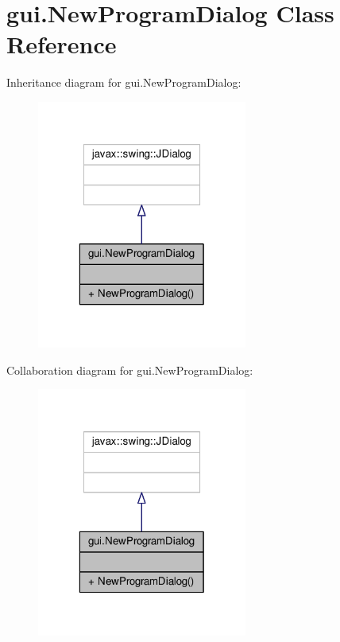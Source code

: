\hypertarget{classgui_1_1NewProgramDialog}{\section{gui.\-New\-Program\-Dialog Class Reference}
\label{classgui_1_1NewProgramDialog}
}


Inheritance diagram for gui.\-New\-Program\-Dialog\-:\nopagebreak
\begin{figure}[H]
\begin{center}
\leavevmode
\includegraphics[width=196pt]{classgui_1_1NewProgramDialog__inherit__graph}
\end{center}
\end{figure}


Collaboration diagram for gui.\-New\-Program\-Dialog\-:\nopagebreak
\begin{figure}[H]
\begin{center}
\leavevmode
\includegraphics[width=196pt]{classgui_1_1NewProgramDialog__coll__graph}
\end{center}
\end{figure}
